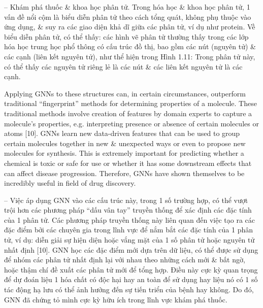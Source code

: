 \documentclass{article}
\begin{document}
\begin{itemize}
\begin{itemize}
\begin{itemize}
            -- {\sf Khám phá thuốc \& khoa học phân tử.} Trong hóa học \& khoa học phân tử, 1 vấn đề nổi cộm là biểu diễn phân tử theo cách tổng quát, không phụ thuộc vào ứng dụng, \& suy ra các giao diện khả dĩ giữa các phân tử, ví dụ như protein. Về biểu diễn phân tử, có thể thấy: các hình vẽ phân tử thường thấy trong các lớp hóa học trung học phổ thông có cấu trúc đồ thị, bao gồm các nút (nguyên tử) \& các cạnh (liên kết nguyên tử), như thể hiện trong {\sf Hình 1.11: Trong phân tử này, có thể thấy các nguyên tử riêng lẻ là các nút \& các liên kết nguyên tử là các cạnh.}

            Applying GNNs to these structures can, in certain circumstances, outperform traditional ``fingerprint'' methods for determining properties of a molecule. These traditional methods involve creation of features by domain experts to capture a molecule's properties, e.g. interpreting presence or absence of certain molecules or atoms [10]. GNNs learn new data-driven features that can be used to group certain molecules together in new \& unexpected ways or even to propose new molecules for synthesis. This is extremely important for predicting whether a chemical is toxic or safe for use or whether it has some downstream effects that can affect disease progression. Therefore, GNNs have shown themselves to be incredibly useful in field of drug discovery.

            -- Việc áp dụng GNN vào các cấu trúc này, trong 1 số trường hợp, có thể vượt trội hơn các phương pháp ``dấu vân tay'' truyền thống để xác định các đặc tính của 1 phân tử. Các phương pháp truyền thống này liên quan đến việc tạo ra các đặc điểm bởi các chuyên gia trong lĩnh vực để nắm bắt các đặc tính của 1 phân tử, ví dụ: diễn giải sự hiện diện hoặc vắng mặt của 1 số phân tử hoặc nguyên tử nhất định [10]. GNN học các đặc điểm mới dựa trên dữ liệu, có thể được sử dụng để nhóm các phân tử nhất định lại với nhau theo những cách mới \& bất ngờ, hoặc thậm chí đề xuất các phân tử mới để tổng hợp. Điều này cực kỳ quan trọng để dự đoán liệu 1 hóa chất có độc hại hay an toàn để sử dụng hay liệu nó có 1 số tác động hạ lưu có thể ảnh hưởng đến sự tiến triển của bệnh hay không. Do đó, GNN đã chứng tỏ mình cực kỳ hữu ích trong lĩnh vực khám phá thuốc.


\end{itemize}
\end{itemize}
\end{itemize}
\end{document}
